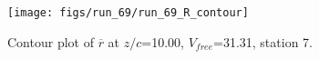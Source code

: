 \begin{figure}[H]
\centering
\texttt{[image: figs/run\_69/run\_69\_R\_contour]}
\caption{Contour plot of $\overline{r}$ at $z/c$=10.00, $V_{free}$=31.31, station 7.}
\label{fig:run_69_R_contour}
\end{figure}


